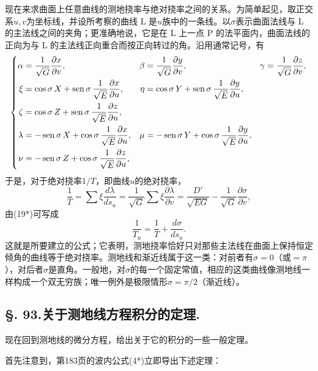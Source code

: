 现在来求曲面上任意曲线的测地挠率与绝对挠率之间的关系。为简单起见，取正交系\(u,v\)为坐标线，并设所考察的曲线 L 是\(u\)族中的一条线。以\(\sigma\)表示曲面法线与 L 的主法线之间的夹角；更准确地说，它是在 L 上一点 P 的法平面内，曲面法线的正向为与 L 的主法线正向重合而按正向转过的角。沿用通常记号，有
\[
\left\{\begin{aligned}
 \alpha&=\frac1{\sqrt G}\frac{\partial x}{\partial v},
 &\beta&=\frac1{\sqrt G}\frac{\partial y}{\partial v},
 &\gamma&=\frac1{\sqrt G}\frac{\partial z}{\partial v},\\
 \xi&=\cos\sigma\,X+\operatorname{sen}\sigma\,\frac1{\sqrt E}\frac{\partial x}{\partial u},
 &\eta&=\cos\sigma\,Y+\operatorname{sen}\sigma\,\frac1{\sqrt E}\frac{\partial y}{\partial u},\\
 \zeta&=\cos\sigma\,Z+\operatorname{sen}\sigma\,\frac1{\sqrt E}\frac{\partial z}{\partial u},\\
 \lambda&=-\operatorname{sen}\sigma\,X+\cos\sigma\,\frac1{\sqrt E}\frac{\partial x}{\partial u},
 &\mu&=-\operatorname{sen}\sigma\,Y+\cos\sigma\,\frac1{\sqrt E}\frac{\partial y}{\partial u},\\
 \nu&=-\operatorname{sen}\sigma\,Z+\cos\sigma\,\frac1{\sqrt E}\frac{\partial z}{\partial u},
\end{aligned}\right.
\]
于是，对于绝对挠率\(1/T\)，即曲线\(u\)的绝对挠率，
\[
 \frac1T=\sum\xi\frac{d\lambda}{ds_u}=\frac1{\sqrt G}\sum\xi\frac{\partial\lambda}{\partial v}=\frac{D'}{\sqrt{EG}}-\frac1{\sqrt G}\frac{\partial\sigma}{\partial v},
\]
由(19*)可写成
\begin{equation}\tag{20}
 \frac1{T_u}=\frac1T+\frac{d\sigma}{ds_u}.
\end{equation}
这就是所要建立的公式；它表明，测地挠率恰好只对那些主法线在曲面上保持恒定倾角的曲线等于绝对挠率。测地线和渐近线属于这一类：对前者有\(\sigma=0\)（或\(=\pi\)），对后者\(\sigma\)是直角。一般地，对\(\sigma\)的每一个固定常值，相应的这类曲线像测地线一样构成一个双无穷族；唯一例外是极限情形\(\sigma=\pi/2\)（渐近线）。

\subsection*{\S. 93.\quad 关于测地线方程积分的定理.}

现在回到测地线的微分方程，给出关于它的积分的一些一般定理。

首先注意到，第183页的波内公式(4*)立即导出下述定理：

